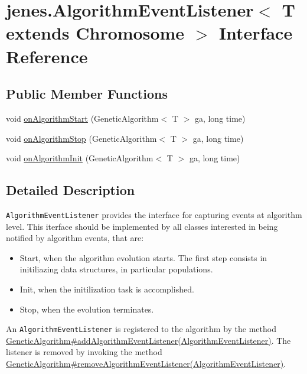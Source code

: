 \hypertarget{interfacejenes_1_1_algorithm_event_listener_3_01_t_01extends_01_chromosome_01_4}{
\section{jenes.AlgorithmEventListener$<$ T extends Chromosome $>$ Interface Reference}
\label{interfacejenes_1_1_algorithm_event_listener_3_01_t_01extends_01_chromosome_01_4}
}
\subsection*{Public Member Functions}
\begin{CompactItemize}
\item 
void \hyperlink{interfacejenes_1_1_algorithm_event_listener_3_01_t_01extends_01_chromosome_01_4_f0d6e9961e685f4d44270a4feedeb70f}{onAlgorithmStart} (GeneticAlgorithm$<$ T $>$ ga, long time)
\item 
void \hyperlink{interfacejenes_1_1_algorithm_event_listener_3_01_t_01extends_01_chromosome_01_4_b494ea60f6000ebcd02a94c7eda70dcf}{onAlgorithmStop} (GeneticAlgorithm$<$ T $>$ ga, long time)
\item 
void \hyperlink{interfacejenes_1_1_algorithm_event_listener_3_01_t_01extends_01_chromosome_01_4_f5f6bb7f487c9ecd01331427a370889e}{onAlgorithmInit} (GeneticAlgorithm$<$ T $>$ ga, long time)
\end{CompactItemize}


\subsection{Detailed Description}
{\tt AlgorithmEventListener} provides the interface for capturing events at algorithm level. This iterface should be implemented by all classes interested in being notified by algorithm events, that are: \begin{itemize}
\item Start, when the algorithm evolution starts. The first step consists in initiliazing data structures, in particular populations. \item Init, when the initilization task is accomplished. \item Stop, when the evolution terminates. \end{itemize}


An {\tt AlgorithmEventListener} is registered to the algorithm by the method \hyperlink{}{GeneticAlgorithm\#addAlgorithmEventListener(AlgorithmEventListener)}. The listener is removed by invoking the method \hyperlink{}{GeneticAlgorithm\#removeAlgorithmEventListener(AlgorithmEventListener)}.  

